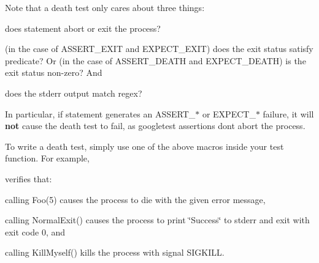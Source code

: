 Note that a death test only cares about three things\+:


\begin{DoxyEnumerate}
\item does {\ttfamily statement} abort or exit the process?
\item (in the case of {\ttfamily A\+S\+S\+E\+R\+T\+\_\+\+E\+X\+IT} and {\ttfamily E\+X\+P\+E\+C\+T\+\_\+\+E\+X\+IT}) does the exit status satisfy {\ttfamily predicate}? Or (in the case of {\ttfamily A\+S\+S\+E\+R\+T\+\_\+\+D\+E\+A\+TH} and {\ttfamily E\+X\+P\+E\+C\+T\+\_\+\+D\+E\+A\+TH}) is the exit status non-\/zero? And
\item does the stderr output match {\ttfamily regex}?
\end{DoxyEnumerate}

In particular, if {\ttfamily statement} generates an {\ttfamily A\+S\+S\+E\+R\+T\+\_\+$\ast$} or {\ttfamily E\+X\+P\+E\+C\+T\+\_\+$\ast$} failure, it will {\bfseries{not}} cause the death test to fail, as googletest assertions don\textquotesingle{}t abort the process.

To write a death test, simply use one of the above macros inside your test function. For example,


\begin{DoxyCode}{0}
\DoxyCodeLine{\}}
\DoxyCodeLine{}
\DoxyCodeLine{\}}
\DoxyCodeLine{}
\DoxyCodeLine{\}}
\end{DoxyCode}


verifies that\+:


\begin{DoxyItemize}
\item calling {\ttfamily Foo(5)} causes the process to die with the given error message,
\item calling {\ttfamily Normal\+Exit()} causes the process to print {\ttfamily \char`\"{}\+Success\char`\"{}} to stderr and exit with exit code 0, and
\item calling {\ttfamily Kill\+Myself()} kills the process with signal {\ttfamily S\+I\+G\+K\+I\+LL}.
\end{DoxyItemize}

